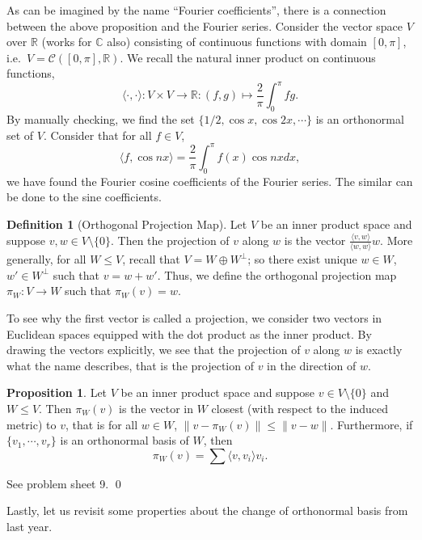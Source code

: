 \documentclass[
]{article}
\theoremstyle{definition}
\newtheorem{prop}{Proposition}[section]
\theoremstyle{definition}
\newtheorem{definition}{Definition}[section]
\begin{document}
As can be imagined by the name ``Fourier coefficients'', there is a
connection between the above proposition and the Fourier series.
Consider the vector space \(V\) over \(\mathbb{R}\) (works for
\(\mathbb{C}\) also) consisting of continuous functions with domain
\([0, \pi]\), i.e.~\(V = \mathcal{C}([0, \pi], \mathbb{R})\). We recall
the natural inner product on continuous functions,
\[\langle \cdot, \cdot \rangle : V \times V \to \mathbb{R} : 
  (f, g) \mapsto \frac{2}{\pi} \int_0^\pi fg.\] By manually checking, we
find the set \(\{1 / 2, \cos x, \cos 2x, \cdots \}\) is an orthonormal
set of \(V\). Consider that for all \(f \in V\),
\[\langle f, \cos n x \rangle = \frac{2}{\pi} \int_0^\pi f(x) \cos nx dx,\]
we have found the Fourier cosine coefficients of the Fourier series. The
similar can be done to the sine coefficients.

\begin{definition}[Orthogonal Projection Map]
  Let \(V\) be an inner product space and suppose \(v, w \in V \setminus \{0\}\).
  Then the projection of \(v\) along \(w\) is the vector
  \(\frac{\langle v, w \rangle}{\langle w, w \rangle} w\). More generally, 
  for all \(W \le V\), recall that \(V = W \oplus W^\bot\); so there exist unique 
  \(w \in W\), \(w' \in W^\bot\) such that \(v = w + w'\). Thus, we define the 
  orthogonal projection map \(\pi_W : V \to W\) such that \(\pi_W(v) = w\). 
\end{definition}

To see why the first vector is called a projection, we consider two
vectors in Euclidean spaces equipped with the dot product as the inner
product. By drawing the vectors explicitly, we see that the projection
of \(v\) along \(w\) is exactly what the name describes, that is the
projection of \(v\) in the direction of \(w\).

\begin{prop}
  Let \(V\) be an inner product space and suppose \(v \in V \setminus \{0\}\) 
  and \(W \le V\). Then \(\pi_W(v)\) is the vector in \(W\) closest (with respect 
  to the induced metric) to \(v\), that is for all \(w \in W\), 
  \(\| v - \pi_W(v) \| \le \| v - w \|\). Furthermore, if \(\{v_1, \cdots, v_r\}\) 
  is an orthonormal basis of \(W\), then 
  \[\pi_W(v) = \sum \langle v, v_i \rangle v_i.\]
\end{prop}
\proof

See problem sheet 9. \qed

Lastly, let us revisit some properties about the change of orthonormal
basis from last year.
\end{document}
